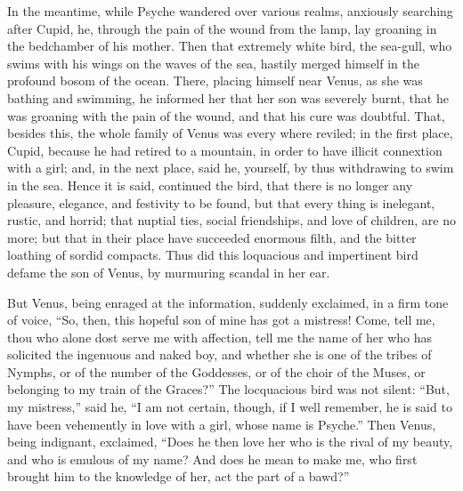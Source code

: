 \documentclass[12pt]{article}
\begin{document}
In the meantime, while Psyche wandered over various realms, anxiously searching
after Cupid, he, through the pain of the wound from the lamp, lay groaning in
the bedchamber of his mother. Then that extremely white bird, the sea-gull, who
swims with his wings on the waves of the sea, hastily merged himself in the
profound bosom of the ocean. There, placing himself near Venus, as she was
bathing and swimming, he informed her that her son was severely burnt, that he
was groaning with the pain of the wound, and that his cure was doubtful. That,
besides this, the whole family of Venus was every where reviled; in the first
place, Cupid, because he had retired to a mountain, in order to have illicit
connextion with a girl; and, in the next place, said he, yourself, by thus
withdrawing to swim in the sea. Hence it is said, continued the bird, that
there is no longer any pleasure, elegance, and festivity to be found, but that
every thing is inelegant, rustic, and horrid; that nuptial ties, social
friendships, and love of children, are no more; but that in their place have
succeeded enormous filth, and the bitter loathing of sordid compacts. Thus did
this loquacious and impertinent bird defame the son of Venus, by murmuring
scandal in her ear.

But Venus, being enraged at the information, suddenly exclaimed, in a firm tone
of voice, ``So, then, this hopeful son of mine has got a mistress! Come, tell
me, thou who alone dost serve me with affection, tell me the name of her who
has solicited the ingenuous and naked boy, and whether she is one of the tribes
of Nymphs, or of the number of the Goddesses, or of the choir of the Muses, or
belonging to my train of the Graces?'' The locquacious bird was not silent:
``But, my mistress,'' said he, ``I am not certain, though, if I well remember,
he is said to have been vehemently in love with a girl, whose name is Psyche.''
Then Venus, being indignant, exclaimed, ``Does he then love her who is the
rival of my beauty, and who is emulous of my name? And does he mean to make me,
who first brought him to the knowledge of her, act the part of a bawd?''
\end{document}
